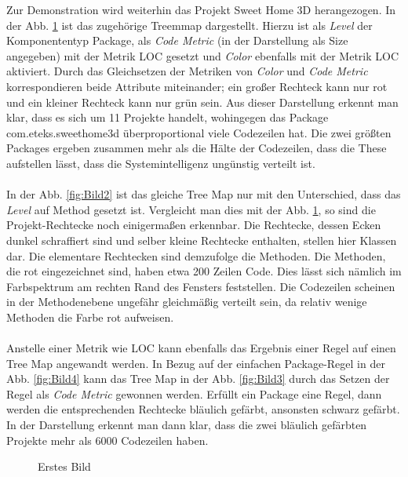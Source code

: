 \documentclass[12pt]{article}
\begin{document}
Zur Demonstration wird weiterhin das Projekt Sweet Home 3D
herangezogen. In der Abb. \ref{fig:Bild1} ist das zugehörige
Treemmap dargestellt. Hierzu ist als \textit{Level} der
Komponententyp Package, als \textit{Code Metric} (in der
Darstellung als Size angegeben) mit der Metrik LOC gesetzt und
\textit{Color} ebenfalls mit der Metrik LOC aktiviert. Durch das
Gleichsetzen der Metriken von \textit{Color} und \textit{Code
Metric} korrespondieren beide Attribute miteinander; ein großer
Rechteck kann nur rot und ein kleiner Rechteck kann nur grün
sein. Aus dieser Darstellung erkennt man klar, dass es sich um 11
Projekte handelt, wohingegen das Package com.eteks.sweethome3d
überproportional viele Codezeilen hat.  Die zwei größten Packages
ergeben zusammen mehr als die Hälte der Codezeilen, dass die
These aufstellen lässt, dass die Systemintelligenz ungünstig
verteilt ist.
\\
\\
In der Abb. \ref{fig:Bild2} ist das gleiche Tree Map nur mit den
Unterschied, dass das \textit{Level} auf Method gesetzt ist.
Vergleicht man dies mit der Abb. \ref{fig:Bild1}, so sind die
Projekt-Rechtecke noch einigermaßen erkennbar. Die Rechtecke,
dessen Ecken dunkel schraffiert sind und selber kleine Rechtecke
enthalten, stellen hier Klassen dar. Die elementare Rechtecken
sind demzufolge die Methoden. Die Methoden, die rot eingezeichnet
sind, haben etwa 200 Zeilen Code. Dies lässt sich nämlich im
Farbspektrum am rechten Rand des Fensters feststellen.  Die
Codezeilen scheinen in der Methodenebene ungefähr gleichmäßig
verteilt sein, da relativ wenige Methoden die Farbe rot
aufweisen.
\\
\\
Anstelle einer Metrik wie LOC kann ebenfalls das Ergebnis einer
Regel auf einen Tree Map angewandt werden. In Bezug auf der
einfachen Package-Regel in der Abb. \ref{fig:Bild4} kann das Tree
Map in der Abb.  \ref{fig:Bild3} durch das Setzen der Regel als
\textit{Code Metric} gewonnen werden. Erfüllt ein Package eine
Regel, dann werden die entsprechenden Rechtecke bläulich gefärbt,
ansonsten schwarz gefärbt. In der Darstellung erkennt man dann
klar, dass die zwei bläulich gefärbten Projekte mehr als 6000
Codezeilen haben.
\begin{figure} 
  \centering
  \caption{Erstes Bild}
  \label{fig:Bild1}
\end{figure}
\end{document}
